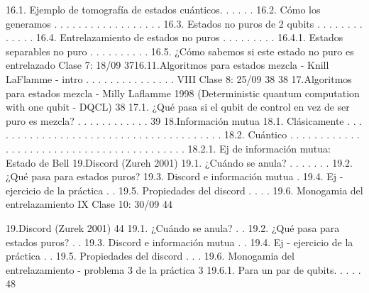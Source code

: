 16.1. Ejemplo de tomografía de estados cuánticos. . . . . .
16.2. Cómo los generamos . . . . . . . . . . . . . . . . . .
16.3. Estados no puros de 2 qubits . . . . . . . . . . . . .
16.4. Entrelazamiento de estados no puros . . . . . . . . .
16.4.1. Estados separables no puro . . . . . . . . . .
16.5. ¿Cómo sabemos si este estado no puro es entrelazado
Clase 7: 18/09
3716.11.Algoritmos para estados mezcla - Knill LaFlamme - intro . . . . . . . . . . . . . . .
VIII
Clase 8: 25/09
38
38
17.Algoritmos para estados mezcla - Milly Laflamme 1998 (Deterministic quantum
computation with one qubit - DQCL)
38
17.1. ¿Qué pasa si el qubit de control en vez de ser puro es mezcla? . . . . . . . . . . . . 39
18.Información mutua
18.1. Clásicamente . . . . . . . . . . . . . . . . . . . . . . . . . . . . . . . . . . . . . . .
18.2. Cuántico . . . . . . . . . . . . . . . . . . . . . . . . . . . . . . . . . . . . . . . . . .
18.2.1. Ej de información mutua: Estado de Bell 19.Discord (Zureh 2001)
19.1. ¿Cuándo se anula? . . . . . . .
19.2. ¿Qué pasa para estados puros?
19.3. Discord e información mutua .
19.4. Ej - ejercicio de la práctica . .
19.5. Propiedades del discord . . . .
19.6. Monogamia del entrelazamiento
IX Clase 10: 30/09 44

19.Discord (Zurek 2001) 44
19.1. ¿Cuándo se anula? . .
19.2. ¿Qué pasa para estados puros? . .
19.3. Discord e información mutua . . 
19.4. Ej - ejercicio de la práctica . .
19.5. Propiedades del discord . . .
19.6. Monogamia del entrelazamiento - problema 3 de la práctica 3 
19.6.1. Para un par de qubits. . . . . 48

